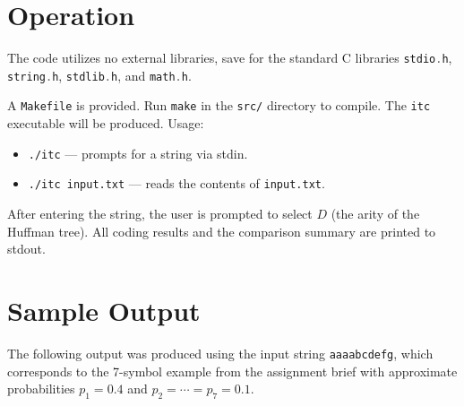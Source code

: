 \documentclass{AnantDocumentation}
\begin{document}
\section{Operation}
The code utilizes no external libraries, save for the standard C libraries \lstinline[language=C]{stdio.h}, \lstinline[language=C]{string.h}, \lstinline[language=C]{stdlib.h}, and \lstinline[language=C]{math.h}.

A \texttt{Makefile} is provided. Run \lstinline{make} in the \texttt{src/} directory to compile. The \texttt{itc} executable will be produced. Usage:
\begin{itemize}
	\item \texttt{./itc} --- prompts for a string via stdin.
	\item \texttt{./itc input.txt} --- reads the contents of \texttt{input.txt}.
\end{itemize}
After entering the string, the user is prompted to select $D$ (the arity of the Huffman tree). All coding results and the comparison summary are printed to stdout.

\newpage
\section{Sample Output}
The following output was produced using the input string \texttt{aaaabcdefg}, which corresponds to the 7-symbol example from the assignment brief with approximate probabilities $p_1=0.4$ and $p_2=\cdots=p_7=0.1$.
\end{document}
